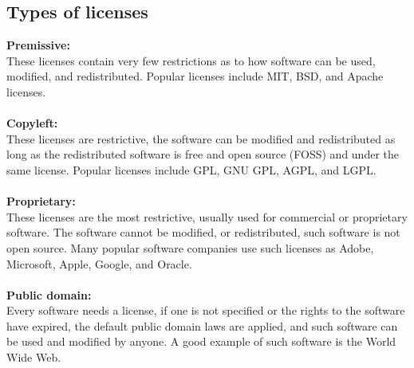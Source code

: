 \documentclass{article}
\begin{document}
\subsection*{Types of licenses}
\textbf{Premissive:}
\\
These licenses contain very few restrictions as to how software can be used, modified, and redistributed. Popular licenses include MIT, BSD, and Apache licenses.
\\\\
\textbf{Copyleft:}
\\
These licenses are restrictive, the software can be modified and redistributed as long as the redistributed software is free and open source (FOSS) and under the same license. Popular licenses include GPL, GNU GPL, AGPL, and LGPL. 
\\\\
\textbf{Proprietary:}
\\
These licenses are the most restrictive, usually used for commercial or proprietary software. The software cannot be modified, or redistributed, such software is not open source. Many popular software companies use such licenses as Adobe, Microsoft, Apple, Google, and Oracle.  
\\\\
\textbf{Public domain:}
\\
Every software needs a license, if one is not specified or the rights to the software have expired, the default public domain laws are applied, and such software can be used and modified by anyone. A good example of such software is the World Wide Web.

\pagebreak
\end{document}
